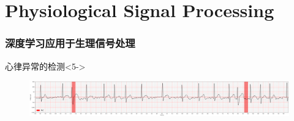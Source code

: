 




\section[PSP]{Physiological Signal Processing}


\begin{frame}
\frametitle{深度学习应用于生理信号处理}

\vspace{1em}


\vspace{1em}

\begin{block}{心律异常的检测}<5->
\begin{figure}
    \centering
    \includegraphics[width=\textwidth,keepaspectratio]{images/CPSC2020_A02_AF1.png}
\end{figure}
\end{block}


\end{frame}


